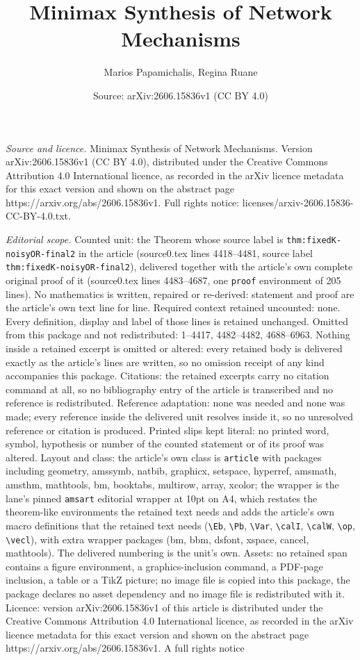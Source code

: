 \documentclass[10pt,a4paper]{amsart}
\title[Minimax Synthesis of Network Mechanisms]{Minimax Synthesis of Network Mechanisms}
\author{Marios Papamichalis, Regina Ruane}
\date{Source: arXiv:2606.15836v1 (CC BY 4.0)}
\begin{document}
\maketitle

\noindent\emph{Source and licence.} Minimax Synthesis of Network Mechanisms. Version arXiv:2606.15836v1 (CC BY 4.0), distributed under the Creative Commons Attribution 4.0 International licence, as recorded in the arXiv licence metadata for this exact version and shown on the abstract page https://arxiv.org/abs/2606.15836v1. Full rights notice: licenses/arxiv-2606.15836-CC-BY-4.0.txt.\par\smallskip

\noindent\textit{Editorial scope.} Counted unit: the Theorem whose source label is \texttt{thm:fixedK-noisyOR-final2} in the article (source0.tex lines 4418--4481, source label \texttt{thm:fixedK-noisyOR-final2}), delivered together with the article's own complete original proof of it (source0.tex lines 4483--4687, one \texttt{proof} environment of 205 lines). No mathematics is written, repaired or re-derived: statement and proof are the article's own text line for line. Required context retained uncounted: none. Every definition, display and label of those lines is retained unchanged. Omitted from this package and not redistributed: 1--4417, 4482--4482, 4688--6963. Nothing inside a retained excerpt is omitted or altered: every retained body is delivered exactly as the article's lines are written, so no omission receipt of any kind accompanies this package. Citations: the retained excerpts carry no citation command at all, so no bibliography entry of the article is transcribed and no reference is redistributed. Reference adaptation: none was needed and none was made; every reference inside the delivered unit resolves inside it, so no unresolved reference or citation is produced. Printed slips kept literal: no printed word, symbol, hypothesis or number of the counted statement or of its proof was altered. Layout and class: the article's own class is \texttt{article} with packages including geometry, amssymb, natbib, graphicx, setspace, hyperref, amsmath, amsthm, mathtools, bm, booktabs, multirow, array, xcolor; the wrapper is the lane's pinned \texttt{amsart} editorial wrapper at 10pt on A4, which restates the theorem-like environments the retained text needs and adds the article's own macro definitions that the retained text needs (\texttt{\textbackslash Eb}, \texttt{\textbackslash Pb}, \texttt{\textbackslash Var}, \texttt{\textbackslash calI}, \texttt{\textbackslash calW}, \texttt{\textbackslash op}, \texttt{\textbackslash vecl}), with extra wrapper packages (bm, bbm, dsfont, xspace, cancel, mathtools). The delivered numbering is the unit's own. Assets: no retained span contains a figure environment, a graphics-inclusion command, a PDF-page inclusion, a table or a TikZ picture; no image file is copied into this package, the package declares no asset dependency and no image file is redistributed with it. Licence: version arXiv:2606.15836v1 of this article is distributed under the Creative Commons Attribution 4.0 International licence, as recorded in the arXiv licence metadata for this exact version and shown on the abstract page https://arxiv.org/abs/2606.15836v1. A full rights notice 
\end{document}
